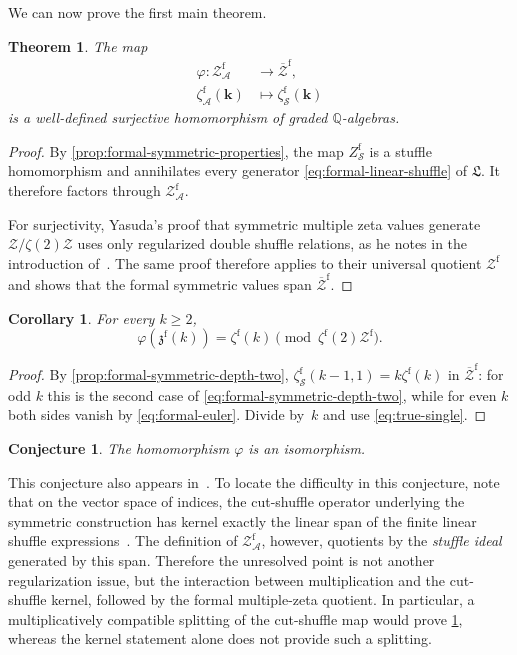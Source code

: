 \documentclass[12pt]{amsart}
\numberwithin{equation}{section}
\theoremstyle{plain}
\newtheorem{thm}{Theorem}[section]
\newtheorem{cor}[cor]{Corollary}
\newtheorem{conj}[conj]{Conjecture}
\newcommand{\QQ}{\mathbb{Q}}
\newcommand{\Zf}{{\mathcal Z^{\mathrm f}}}
\newcommand{\ZAf}{{\mathcal Z_{\mathcal A}^{\mathrm f}}}
\newcommand{\Zbarf}{{\overline{\mathcal Z}^{\mathrm f}}}
\newcommand{\zf}[1]{\zeta^{\mathrm f}(#1)}
\newcommand{\zaf}[1]{\zeta_{\mathcal A}^{\mathrm f}(#1)}
\newcommand{\zsf}[1]{\zeta_{\mathcal S}^{\mathrm f}(#1)}
\newcommand{\zzf}[1]{\mathfrak z^{\mathrm f}(#1)}
\begin{document}
We can now prove the first main theorem.

\begin{thm}\label{thm:formal-kz}
The map
\begin{align*}
 \varphi:\ZAf&\longrightarrow\Zbarf,\\
 \zaf{\boldsymbol{k}}&\longmapsto\zsf{\boldsymbol{k}}
\end{align*}
is a well-defined surjective homomorphism of graded $\QQ$-algebras.
\end{thm}

\begin{proof}
By \cref{prop:formal-symmetric-properties}, the map
$Z_{\mathcal S}^{\mathrm f}$ is a stuffle homomorphism and annihilates every
generator \eqref{eq:formal-linear-shuffle} of $\mathfrak L$. It therefore
factors through $\ZAf$.

For surjectivity, Yasuda's proof that symmetric multiple zeta values generate
$\mathcal Z/\zeta(2)\mathcal Z$ uses only regularized double shuffle
relations, as he notes in the introduction of~\cite{Yasuda}. The same proof
therefore applies to their universal quotient $\Zf$ and shows that the formal
symmetric values span $\Zbarf$.
\end{proof}

\begin{cor}\label{cor:true-single}
For every $k\geq2$,
\[
 \varphi(\zzf{k})=\zf{k}\pmod{\zf{2}\Zf}.
\]
\end{cor}

\begin{proof}
By \cref{prop:formal-symmetric-depth-two},
$\zsf{k-1,1}=k\zf{k}$ in $\Zbarf$: for odd $k$ this is the second case of \eqref{eq:formal-symmetric-depth-two}, while for even $k$ both sides vanish by \eqref{eq:formal-euler}. Divide by~$k$ and use \eqref{eq:true-single}.
\end{proof}

\begin{conj}\label{conj:formal-kz}
The homomorphism $\varphi$ is an isomorphism.
\end{conj}

This conjecture also appears in~\cite[Conjecture~7.6]{Anzawa}.
To locate the difficulty in this conjecture, note that on the
vector space of indices, the cut-shuffle operator underlying the symmetric
construction has kernel exactly the linear span of the finite linear
shuffle expressions~\cite[Proposition~12]{KZ}. The definition of $\ZAf$,
however, quotients by the \emph{stuffle ideal} generated by this span.
Therefore the unresolved point is not another regularization issue, but the
interaction between multiplication and the cut-shuffle kernel, followed by
the formal multiple-zeta quotient. In particular, a multiplicatively
compatible splitting of the cut-shuffle map would prove
\cref{conj:formal-kz}, whereas the kernel statement alone does
not provide such a splitting.
\end{document}
